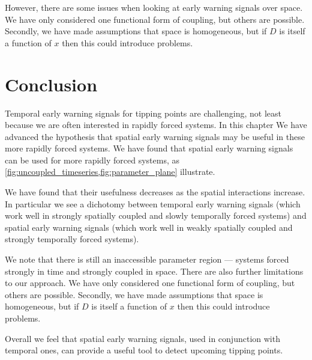     However, there are some issues when looking at early warning signals over space. We have only 
    considered one functional form of coupling, but others are possible. Secondly, we have made
    assumptions that space is homogeneous, but if $D$ is itself a function of $x$ then this could
    introduce problems.
\section{Conclusion}

Temporal early warning signals for tipping points are challenging, not least because we are often interested in rapidly forced systems. In this chapter
We have advanced the hypothesis that spatial early warning signals may be useful in these more rapidly forced systems.
We have found that spatial early warning signals can be used for more rapidly forced systems, as \cref{fig:uncoupled_timeseries,fig:parameter_plane}
illustrate.

We have found that their usefulness decreases as the spatial interactions increase.
In particular we see a dichotomy between temporal early warning signals (which work well in strongly spatially coupled and slowly temporally forced systems)
and spatial early warning signals (which work well in weakly spatially coupled and strongly temporally forced systems).

We note that there is still an inaccessible parameter region --- systems forced strongly in time and strongly coupled in space. There are also further limitations
to our approach.  We have only considered one functional form of coupling, but others are possible. Secondly, we have made
assumptions that space is homogeneous, but if $D$ is itself a function of $x$ then this could introduce problems.

Overall we feel that spatial early warning signals, used in conjunction with temporal ones, can provide a useful tool to detect upcoming tipping points.